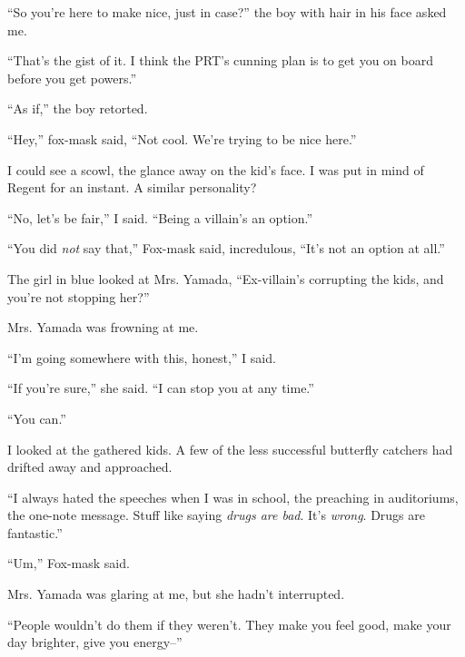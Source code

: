 ``So you're here to make nice, just in case?'' the boy with hair in his face asked me.



``That's the gist of it.  I think the PRT's cunning plan is to get you on board before you get powers.''



``As if,'' the boy retorted.



``Hey,'' fox-mask said, ``Not cool.  We're trying to be nice here.''



I could see a scowl, the glance away on the kid's face.  I was put in mind of Regent for an instant.  A similar personality?



``No, let's be fair,'' I said.  ``Being a villain's an option.''



``You did\emph{ not }say that,'' Fox-mask said, incredulous, ``It's not an option at all.''



The girl in blue looked at Mrs. Yamada, ``Ex-villain's corrupting the kids, and you're not stopping her?''



Mrs. Yamada was frowning at me.



``I'm going somewhere with this, honest,'' I said.



``If you're sure,'' she said.  ``I can stop you at any time.''



``You can.''



I looked at the gathered kids.  A few of the less successful butterfly catchers had drifted away and approached.



``I always hated the speeches when I was in school, the preaching in auditoriums, the one-note message.  Stuff like saying \emph{drugs are bad}.  It's \emph{wrong}.  Drugs are fantastic.''



``Um,'' Fox-mask said.



Mrs. Yamada was glaring at me, but she hadn't interrupted.



``People wouldn't do them if they weren't.  They make you feel good, make your day brighter, give you energy--''



